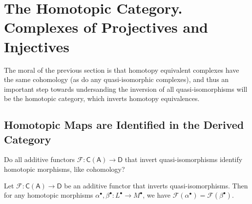 \section{The Homotopic Category. Complexes of Projectives and Injectives}
The moral of the previous section is that homotopy equivalent complexes have the same cohomology (as do any quasi-isomorphic complexes), and thus an important step towards undersanding the inversion of all quasi-isomorphisms will be the homotopic category, which inverts homotopy equivalences.
\subsection{Homotopic Maps are Identified in the Derived Category}
Do all additive functors $\mathscr{F} : \mathsf{C} (\mathsf{A} ) \to \mathsf{D} $ that invert quasi-isomorphisms identify homotopic morphisms, like cohomology?
\begin{lemma}\label{lma:9.5.1}
	Let $\mathscr{F} : \mathsf{C} (\mathsf{A} ) \to \mathsf{D} $ be an additive functor that inverts quasi-isomorphisms. Then for any homotopic morphisms $\alpha ^{\bullet} ,\beta ^{\bullet} : L^{\bullet}  \to M^{\bullet} $, we have $\mathscr{F} (\alpha ^{\bullet} )=\mathscr{F} (\beta ^{\bullet} )$.
\end{lemma}
